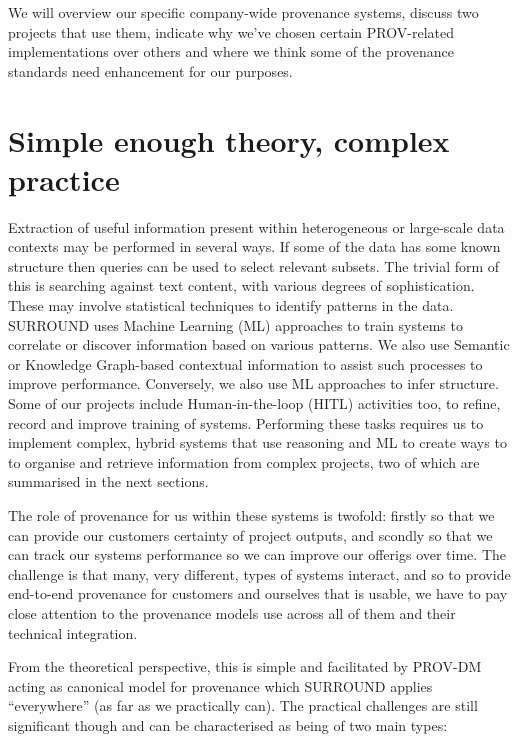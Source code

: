 \documentclass[letterpaper,twocolumn,10pt]{article}
\begin{document}
We will overview our specific company-wide provenance systems, discuss two projects that use them, indicate 
why we've chosen certain PROV-related implementations over others and where we think some of the provenance
standards need enhancement for our purposes.


\section{Simple enough theory, complex practice}
Extraction of useful information present within heterogeneous or large-scale data contexts may be performed in several 
ways. If some of the data has some known structure then queries can be used to select relevant subsets. The trivial form 
of this is searching against text content, with various degrees of sophistication. These may involve statistical 
techniques to identify patterns in the data. SURROUND uses Machine Learning (ML) approaches to train systems to correlate or 
discover information based on various patterns. We also use Semantic or Knowledge Graph-based contextual information to 
assist such processes to improve performance. Conversely, we also use ML approaches to infer structure. Some of our projects
include Human-in-the-loop (HITL) activities too, to refine, record and improve training of systems. Performing these tasks 
requires us to implement complex, hybrid systems that use reasoning and ML to create ways to to organise and retrieve 
information from complex projects, two of which are summarised in the next sections.  

The role of provenance for us within these systems is twofold: firstly so that we can provide our customers certainty of project 
outputs, and scondly so that we can track our systems performance so we can improve our offerigs over time. The challenge 
is that many, very different, types of systems interact, and so to provide end-to-end provenance for customers and ourselves
that is usable, we have to pay close attention to the provenance models use across all of them and their technical integration.

From the theoretical perspective, this is simple and facilitated by PROV-DM acting as canonical model for provenance which SURROUND
applies ``everywhere'' (as far as we practically can). The practical challenges are still significant though and can be 
characterised as being of two main types:
\end{document}
